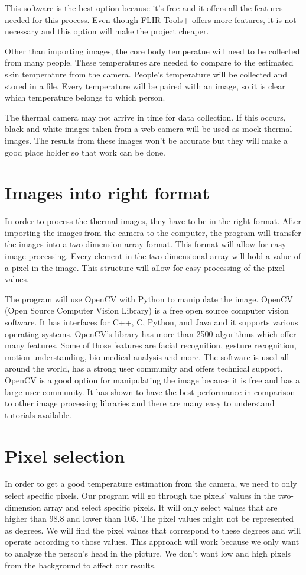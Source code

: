 \documentclass[onecolumn, draftclsnofoot,10pt, compsoc]{IEEEtran}
\begin{document}
This software is the best option because it’s free and it offers all the features needed for this process. Even though FLIR Tools+ offers more features, it is not necessary and this option will make the project cheaper.

Other than importing images, the core body temperatue will need to be collected from many people. These temperatures are needed to compare to the estimated skin temperature from the camera. People’s temperature will be collected and stored in a file. Every temperature will be paired with an image, so it is clear which temperature belongs to which person. 

The thermal camera may not arrive in time for data collection. If this occurs, black and white images taken from a web camera will be used as mock thermal images. The results from these images won't be accurate but they will make a good place holder so that work can be done. 


\section{Images into right format}

In order to process the thermal images, they have to be in the right format. After importing the images from the camera to the computer, the program will transfer the images into a two-dimension array format. This format will allow for easy image processing. Every element in the two-dimensional array will hold a value of a pixel in the image. This structure will allow for easy processing of the pixel values. 

The program will use OpenCV with Python to manipulate the image. OpenCV (Open Source Computer Vision Library) is a free open source computer vision software. It has interfaces for C++, C, Python, and Java and it supports various operating systems. OpenCV’s library has more than 2500 algorithms which offer many features. Some of those features are facial recognition, gesture recognition, motion understanding, bio-medical analysis and more. The software is used all around the world, has a strong user community and offers technical support. OpenCV is a good option for manipulating the image because it is free and has a large user community. It has shown to have the best performance in comparison to other image processing libraries and there are many easy to understand tutorials available.\cite{ClaudeTech}

\section{Pixel selection}
In order to get a good temperature estimation from the camera, we need to only select specific pixels. Our program will go through the pixels’ values in the two-dimension array and select specific pixels. It will only select values that are higher than 98.8 and lower than 105. The pixel values might not be represented as degrees. We will find the pixel values that correspond to these degrees and will operate according to those values. This approach will work because we only want to analyze the person’s head in the picture. We don’t want low and high pixels from the background to affect our results. 
\end{document}
